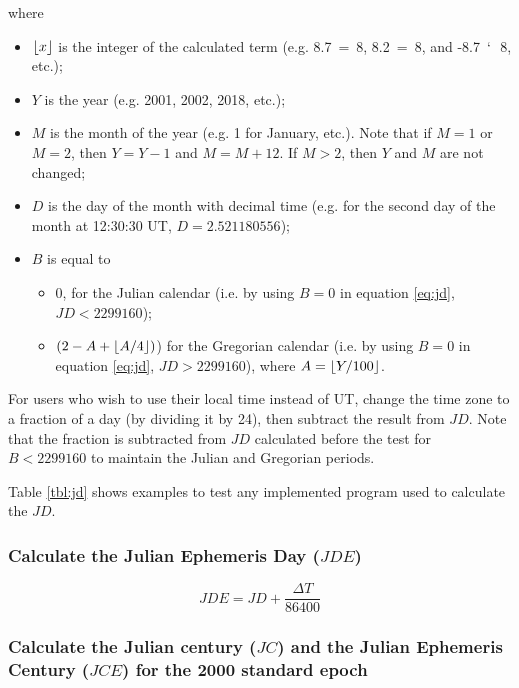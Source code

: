 \documentclass{article}
\DeclarePairedDelimiter\floor{\lfloor}{\rfloor}
\begin{document}
\par where
\begin{itemize}
\item $\floor{x}$ is the integer of the calculated term (e.g. 8.7~=~8,
  8.2~=~8, and -8.7~` ­ 8, etc.);
\item $Y$ is the year (e.g. 2001, 2002, 2018, etc.);
\item $M$ is the month of the year (e.g. 1 for January, etc.). Note
  that if $M = 1$ or $M = 2$, then $Y = Y - 1$ and $M = M + 12$. If
  $M > 2$, then $Y$ and $M$ are not changed;
\item $D$ is the day of the month with decimal time (e.g. for the
  second day of the month at 12:30:30 UT, $D = 2.521180556$);
\item $B$ is equal to
  \begin{itemize}
  \item $0$, for the Julian calendar (i.e. by using $B = 0$ in equation
    \ref{eq:jd}, $JD < 2299160$);
  \item $(2 - A + \floor{A/4})$) for the Gregorian calendar (i.e. by
    using $B = 0$ in equation \ref{eq:jd}, $JD > 2299160$), where $A
    = \floor{Y/100}$.
  \end{itemize}
\end{itemize}

\par For users who wish to use their local time instead of UT, change the
time zone to a fraction of a day (by dividing it by 24), then subtract
the result from $JD$. Note that the fraction is subtracted from $JD$
calculated before the test for $B < 2299160$ to maintain the Julian
and Gregorian periods.

\par Table \ref{tbl:jd} shows examples to test any implemented program
used to calculate the $JD$.

\subsubsection{Calculate the Julian Ephemeris Day ($JDE$)}

\begin{equation}
  \label{eq:jde}
  JDE = JD + \frac{\Delta T}{86400}
\end{equation}

\subsubsection{Calculate the Julian century ($JC$) and the Julian
  Ephemeris Century ($JCE$) for the 2000 standard epoch}
\end{document}
